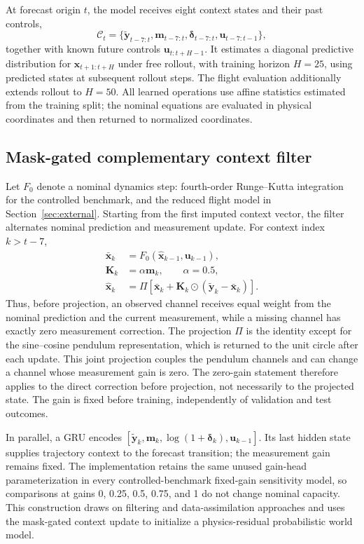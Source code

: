 \documentclass[iicol,pdflatex,sn-basic,Numbered]{sn-jnl}
\newcommand{\vect}[1]{\mathbf{#1}}
\begin{document}
At forecast origin $t$, the model receives eight context states and their past
controls,
\begin{equation}
 \mathcal C_t=\{\tilde{\vect y}_{t-7:t},\vect m_{t-7:t},
 \boldsymbol\delta_{t-7:t},\vect u_{t-7:t-1}\},
\end{equation}
together with known future controls $\vect u_{t:t+H-1}$. It estimates a
diagonal predictive distribution for $\vect{x}_{t+1:t+H}$ under free rollout,
with training horizon $H=25$, using predicted states at subsequent rollout
steps. The flight evaluation additionally extends rollout to $H=50$. All learned
operations use affine statistics estimated from the training split; the
nominal equations are evaluated in physical coordinates and then returned to
normalized coordinates.

\subsection{Mask-gated complementary context filter}

Let $F_0$ denote a nominal dynamics step: fourth-order Runge--Kutta integration
for the controlled benchmark, and the reduced flight model in
Section~\ref{sec:external}. Starting from the first imputed context vector, the
filter alternates nominal prediction and measurement update. For context index
$k>t-7$,
\begin{align}
 \bar{\vect x}_{k} &= F_0(\hat{\vect x}_{k-1},\vect u_{k-1}),\\
 \vect K_k &= \alpha\vect m_k,\qquad \alpha=0.5,\\
 \hat{\vect x}_k &= \Pi\!\left[
 \bar{\vect x}_k+\vect K_k\odot
 (\tilde{\vect y}_k-\bar{\vect x}_k)\right].
 \label{eq:complementary-update}
\end{align}
Thus, before projection, an observed channel receives equal weight from the
nominal prediction and the current measurement, while a missing channel has
exactly zero measurement correction. The projection $\Pi$ is the identity
except for the sine--cosine pendulum representation, which is returned to the
unit circle after each update. This joint projection couples the pendulum
channels and can change a channel whose measurement gain is zero. The zero-gain
statement therefore applies to the direct correction before projection, not
necessarily to the projected state. The gain is
fixed before training, independently of validation and test outcomes.

In parallel, a GRU encodes
$[\tilde{\vect y}_k,\vect m_k,\log(1+\boldsymbol\delta_k),\vect u_{k-1}]$.
Its last hidden state supplies trajectory context to the forecast transition;
the measurement gain remains fixed. The implementation retains the
same unused gain-head parameterization in every controlled-benchmark
fixed-gain sensitivity model,
so comparisons at gains 0, 0.25, 0.5, 0.75, and 1 do not change nominal
capacity. This construction draws on filtering and data-assimilation approaches
\cite{revach2022_kalmannet,cheng2023_machine_learning_with_data_assimilation}
and uses the mask-gated context update to initialize a physics-residual
probabilistic world model.
\end{document}

